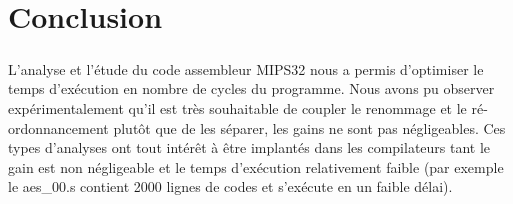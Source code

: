 \documentclass[a4paper,12pt]{report}
\begin{document}
\chapter{Conclusion}
\paragraph*{}
L'analyse et l'étude du code assembleur MIPS32 nous a permis d'optimiser le temps d'exécution en nombre de cycles du programme. Nous avons pu observer expérimentalement qu'il est très souhaitable de coupler le renommage et le ré-ordonnancement plutôt que de les séparer, les gains ne sont pas négligeables.
Ces types d'analyses ont tout intérêt à être implantés dans les compilateurs tant le gain est non négligeable et le temps d'exécution relativement faible (par exemple le aes\_00.s contient 2000 lignes de codes et s'exécute en un faible délai).
\end{document}
